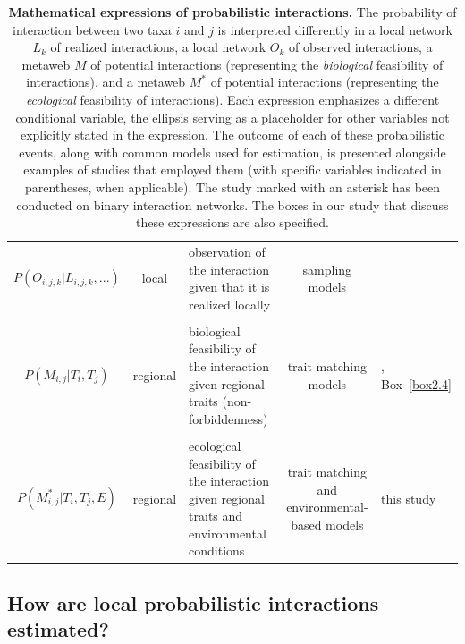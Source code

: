 \begin{table}[h!]
{\begin{tabular}{c c p{5cm} c p{6cm}}
  \\
  $P(O_{i, j, k} \vert L_{i, j, k},...)$ & local & observation of the interaction given that it is realized locally & sampling models & \cite{Catchen2023Missinga} \\
  \\
  $P(M_{i, j} \vert T_i, T_j)$ & regional & biological feasibility of the interaction given regional traits (non-forbiddenness) & trait matching models & \cite{Strydom2022Food}, Box~\ref{box2.4} \\
  \\
  $P(M^*_{i, j} \vert T_i, T_j, E)$ & regional & ecological feasibility of the interaction given regional traits and environmental conditions & \makecell{trait matching and \\ environmental-based models} & this study \\
  \hline
  \end{tabular}
  }
  \caption{\textbf{Mathematical expressions of probabilistic interactions.} The
  probability of interaction between two taxa $i$ and $j$ is interpreted
  differently in a local network $L_k$ of realized interactions, a local network
  $O_k$ of observed interactions, a metaweb $M$ of potential interactions
  (representing the \textit{biological} feasibility of interactions), and a metaweb $M^*$
  of potential interactions (representing the \textit{ecological} feasibility of
  interactions). Each expression emphasizes a different conditional variable, the
  ellipsis serving as a placeholder for other variables not explicitly stated in
  the expression. The outcome of each of these probabilistic events, along with
  common models used for estimation, is presented alongside examples of studies
  that employed them (with specific variables indicated in parentheses, when
  applicable). The study marked with an asterisk has been conducted on binary
  interaction networks. The boxes in our study that discuss these expressions are
  also specified.}
  \label{tbl:prob}
\end{table}

\clearpage

\subsection{How are local probabilistic interactions estimated?}

